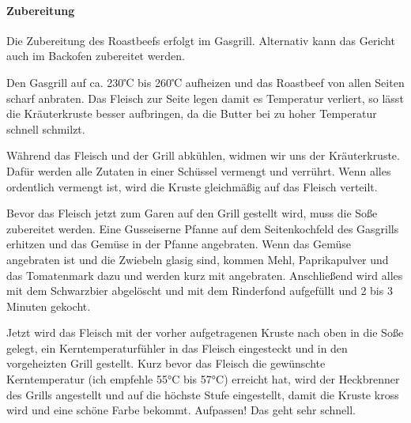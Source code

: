 \paragraph{Zubereitung}

Die Zubereitung des Roastbeefs erfolgt im Gasgrill. Alternativ kann das
Gericht auch im Backofen zubereitet werden. 

Den Gasgrill auf ca. 230℃ 
bis 260℃ aufheizen und das Roastbeef von allen Seiten scharf anbraten. Das 
Fleisch zur Seite legen damit es Temperatur verliert, so lässt die Kräuterkruste 
besser aufbringen, da die Butter bei zu hoher Temperatur schnell schmilzt.

Während das Fleisch und der Grill abkühlen, widmen wir uns der Kräuterkruste. 
Dafür werden alle Zutaten in einer Schüssel vermengt und 
verrührt.
Wenn alles ordentlich vermengt ist, wird die Kruste gleichmäßig auf das
Fleisch verteilt.

Bevor das Fleisch jetzt zum Garen auf den Grill gestellt wird, muss
die Soße zubereitet werden. Eine Gusseiserne Pfanne auf dem 
Seitenkochfeld
des Gasgrills erhitzen und das Gemüse in der Pfanne angebraten. Wenn 
das
Gemüse angebraten ist und die Zwiebeln glasig sind, kommen Mehl,
Paprikapulver und das Tomatenmark dazu und werden kurz mit 
angebraten.
Anschließend wird alles mit dem Schwarzbier abgelöscht und mit dem
Rinderfond aufgefüllt und 2 bis 3 Minuten gekocht.

Jetzt wird das Fleisch mit der vorher aufgetragenen Kruste nach oben in
die Soße gelegt, ein Kerntemperaturfühler in das Fleisch eingesteckt und in den 
vorgeheizten Grill gestellt.
Kurz bevor das Fleisch die gewünschte Kerntemperatur (ich empfehle 55°C bis 
57°C) erreicht hat, wird
der Heckbrenner des Grills angestellt und auf die höchste Stufe 
eingestellt, damit die Kruste kross wird und eine schöne Farbe bekommt. 
Aufpassen!
Das geht sehr schnell.

